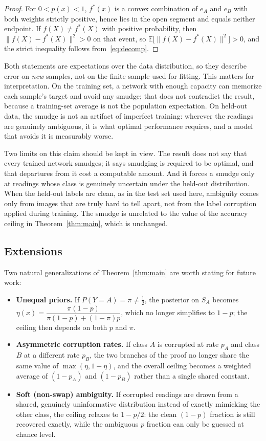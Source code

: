 \documentclass[11pt]{article}
\begin{document}
\begin{proof}
For $0<p(x)<1$, $f^*(x)$ is a convex combination of $e_A$ and $e_B$ with both
weights strictly positive, hence lies in the open segment and equals neither
endpoint. If $f(X)\neq f^*(X)$ with positive probability, then
$\|f(X)-f^*(X)\|^2 > 0$ on that event, so
$\mathbb{E}\big[\|f(X)-f^*(X)\|^2\big] > 0$, and the strict inequality follows
from~\eqref{eq:decomp}.
\end{proof}

Both statements are expectations over the data distribution, so they describe
error on \emph{new} samples, not on the finite sample used for fitting. This
matters for interpretation. On the training set, a network with enough
capacity can memorize each sample's target and avoid any smudge; that does
not contradict the result, because a training-set average is not the
population expectation. On held-out data, the smudge is not an artifact of
imperfect training: wherever the readings are genuinely ambiguous, it is what
optimal performance requires, and a model that avoids it is measurably worse.

Two limits on this claim should be kept in view. The result does not say that
every trained network smudges; it says smudging is required to be optimal, and
that departures from it cost a computable amount. And it forces a smudge only
at readings whose class is genuinely uncertain under the held-out
distribution. When the held-out labels are clean, as in the test set used
here, ambiguity comes only from images that are truly hard to tell apart, not
from the label corruption applied during training. The smudge is unrelated to
the value of the accuracy ceiling in Theorem~\ref{thm:main}, which is
unchanged.

\subsection{Extensions}

Two natural generalizations of Theorem~\ref{thm:main} are worth stating for
future work:

\begin{itemize}
  \item \textbf{Unequal priors.} If $P(Y=A) = \pi \neq \tfrac12$, the
  posterior on $S_A$ becomes
  $\eta(x) = \dfrac{\pi(1-p)}{\pi(1-p) + (1-\pi)p}$,
  which no longer simplifies to $1-p$; the ceiling then depends on both
  $p$ and $\pi$.
  \item \textbf{Asymmetric corruption rates.} If class $A$ is corrupted at
  rate $p_A$ and class $B$ at a different rate $p_B$, the two branches of
  the proof no longer share the same value of $\max(\eta, 1-\eta)$, and the
  overall ceiling becomes a weighted average of $(1-p_A)$ and $(1-p_B)$
  rather than a single shared constant.
  \item \textbf{Soft (non-swap) ambiguity.} If corrupted readings are drawn
  from a shared, genuinely uninformative distribution instead of exactly
  mimicking the other class, the ceiling relaxes to $1 - p/2$: the clean
  $(1-p)$ fraction is still recovered exactly, while the ambiguous $p$
  fraction can only be guessed at chance level.
\end{itemize}
\end{document}
